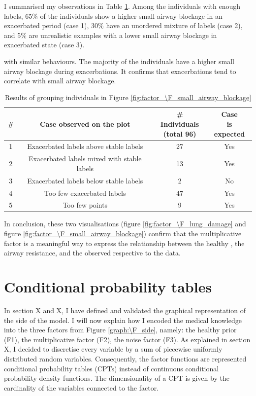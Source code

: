 I summarised my observations in Table \ref{tab:n_ex_labels}. Among the individuals with enough labels, 65\% of the individuals show a higher small airway blockage in an exacerbated period (case 1), 30\% have an unordered mixture of labels (case 2), and 5\% are unrealistic examples with a lower small airway blockage in exacerbated state (case 3).
\begin{table}
\centering
\label{tab:n_ex_labels}
\caption{Results of grouping individuals in Figure \ref{fig:factor_\F_small_airway_blockage}} with similar behaviours. The majority of the individuals have a higher small airway blockage during exacerbations. It confirms that exacerbations tend to correlate with small airway blockage.
\begin{tabular}{c|c|c|c}
\textbf{\#} & \textbf{Case observed on the plot}& \specialcell{\textbf{\# Individuals}\\\textbf{(total 96)}} & \specialcell{\textbf{Case}\\\textbf{is expected}} \\
\hline
1 & Exacerbated labels above stable labels      & 27                       & Yes                \\
2 & Exacerbated labels mixed with stable labels & 13                       & Yes                  \\
3 &Exacerbated labels below stable labels      & 2                        & No                   \\
4 & Too few exacerbated labels                  & 47                       & Yes                  \\
5 & Too few points                              & 9                        & Yes                  
\end{tabular}
\end{table}

In conclusion, these two visualisations (figure \ref{fig:factor_\F_lung_damage} and figure \ref{fig:factor_\F_small_airway_blockage}) confirm that the multiplicative factor is a meaningful way to express the relationship between the healthy \F, the airway resistance, and the observed \F respective to the data.

\section{Conditional probability tables}
In section X and X, I have defined and validated the graphical representation of the \F side of the model. I will now explain how I encoded the medical knowledge into the three factors  from Figure \ref{graph:\F_side}, namely: the healthy \F prior (F1), the multiplicative factor (F2), the noise factor (F3). As explained in section X, I decided to discretise every variable by a sum of piecewise uniformly distributed random variables. Consequently, the factor functions are represented conditional probability tables (CPTs) instead of continuous conditional probability density functions. The dimensionality of a CPT is given by the cardinality of the variables connected to the factor. 

